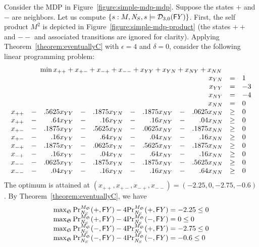 


Consider the MDP in Figure~\ref{figure:simple-mdp-mdp}. Suppose the
states $+$ and $-$ are neighbors. Let us compute $\{ s : M,
\neighbor{S}, s \models \dpriv{3}{0} (\F Y) \}$. First, the self
product $M^2$ is depicted in Figure~\ref{figure:simple-mdp-product}
(the states $++$ and $--$ and associated transitions are ignored
for clarity). Applying
Theorem~\ref{theorem:eventuallyC} with $\epsilon = 4$ and $\delta = 0$, 
consider the following linear programming problem:
\[
\begin{array}{rcrcrcrcrcl}
  \multicolumn{11}{c}{
  \min x_{++} + x_{+-} + x_{-+} + x_{--} + x_{YY} + x_{YN} + x_{NY} + x_{NN}
  }\\
  \multicolumn{9}{r}{ x_{YN} } & = & 1 \\
  \multicolumn{9}{r}{ x_{YY} } & = & -3 \\
  \multicolumn{9}{r}{ x_{NY} } & = & -4 \\
  \multicolumn{9}{r}{ x_{NN} } & = & 0 \\
  x_{++} &-&   .5625 x_{YY} &-& .1875 x_{YN} &-& .1875 x_{NY} &-&
               .0625 x_{NN} & \geq & 0\\
  x_{++} &-&   .64   x_{YY} &-& .16   x_{YN} &-& .16   x_{NY} &-&
               .04   x_{NN} & \geq & 0\\
  x_{+-} &-&   .1875 x_{YY} &-& .5625 x_{YN} &-& .0625 x_{NY} &-& 
               .1875 x_{NN} & \geq & 0\\
  x_{+-} &-&   .16   x_{YY} &-& .64   x_{YN} &-& .04   x_{NY} &-&
               .16   x_{NN} & \geq & 0\\
  x_{-+} &-&   .1875 x_{YY} &-& .0625 x_{YN} &-& .5625 x_{NY} &-& 
               .1875 x_{NN} & \geq & 0\\
  x_{-+} &-&   .16   x_{YY} &-& .04   x_{YN} &-& .64   x_{NY} &-&
               .16   x_{NN} & \geq & 0\\
  x_{--} &-&   .0625 x_{YY} &-& .1875 x_{YN} &-& .1875 x_{NY} &-&
               .5625 x_{NN} & \geq & 0\\
  x_{--} &-&   .04   x_{YY} &-& .16   x_{YN} &-& .16   x_{NY} &-&
               .64   x_{NN} & \geq & 0
\end{array}
\]
The optimum is attained at 
$(x_{++}, x_{+-}, x_{-+}, x_{--}) = (-2.25, 0, -2.75, -0.6)$. By
Theorem~\ref{theorem:eventuallyC}, we have
\[
\begin{array}{l}
\max_{\scheduler{S}}
\myPr{+}{M_{\scheduler{S}}}{\neighbor{S}}{\F Y} -
4 \myPr{+}{M_{\scheduler{S}}}{\neighbor{S}}{\F Y}
= -2.25 \leq 0\\
\max_{\scheduler{S}}
\myPr{+}{M_{\scheduler{S}}}{\neighbor{S}}{\F Y} -
4 \myPr{-}{M_{\scheduler{S}}}{\neighbor{S}}{\F Y}
= 0 \leq 0 \\
\max_{\scheduler{S}}
\myPr{-}{M_{\scheduler{S}}}{\neighbor{S}}{\F Y} -
4 \myPr{+}{M_{\scheduler{S}}}{\neighbor{S}}{\F Y}
= -2.75 \leq 0\\
\max_{\scheduler{S}}
\myPr{-}{M_{\scheduler{S}}}{\neighbor{S}}{\F Y} -
4 \myPr{-}{M_{\scheduler{S}}}{\neighbor{S}}{\F Y}
= -0.6 \leq 0
\end{array}
\]
